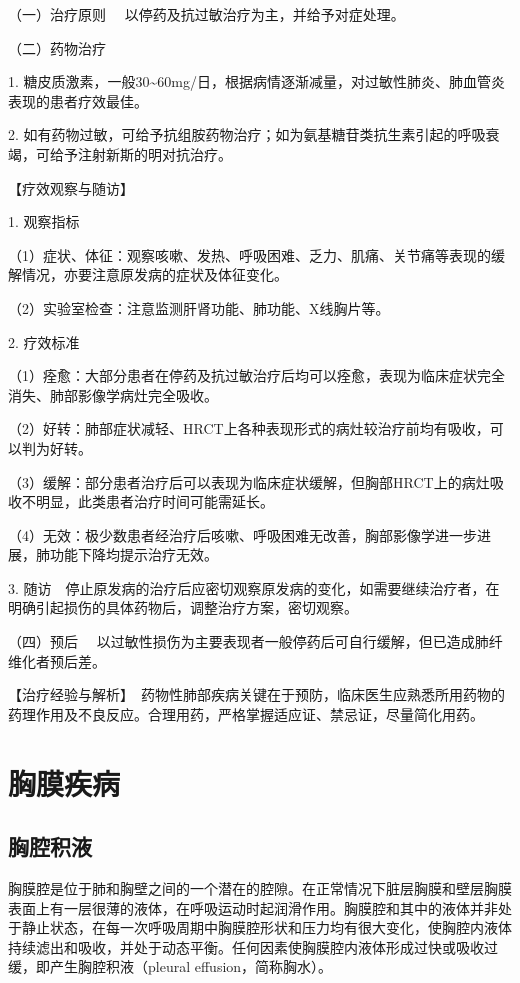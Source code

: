 {（一）治疗原则} 　以停药及抗过敏治疗为主，并给予对症处理。

{（二）药物治疗}

1.
糖皮质激素，一般30\textasciitilde{}60mg/日，根据病情逐渐减量，对过敏性肺炎、肺血管炎表现的患者疗效最佳。

2.
如有药物过敏，可给予抗组胺药物治疗；如为氨基糖苷类抗生素引起的呼吸衰竭，可给予注射新斯的明对抗治疗。

【疗效观察与随访】

1. 观察指标

（1）症状、体征：观察咳嗽、发热、呼吸困难、乏力、肌痛、关节痛等表现的缓解情况，亦要注意原发病的症状及体征变化。

（2）实验室检查：注意监测肝肾功能、肺功能、X线胸片等。

2. 疗效标准

（1）痊愈：大部分患者在停药及抗过敏治疗后均可以痊愈，表现为临床症状完全消失、肺部影像学病灶完全吸收。

（2）好转：肺部症状减轻、HRCT上各种表现形式的病灶较治疗前均有吸收，可以判为好转。

（3）缓解：部分患者治疗后可以表现为临床症状缓解，但胸部HRCT上的病灶吸收不明显，此类患者治疗时间可能需延长。

（4）无效：极少数患者经治疗后咳嗽、呼吸困难无改善，胸部影像学进一步进展，肺功能下降均提示治疗无效。

3.
随访　停止原发病的治疗后应密切观察原发病的变化，如需要继续治疗者，在明确引起损伤的具体药物后，调整治疗方案，密切观察。

{（四）预后}
　以过敏性损伤为主要表现者一般停药后可自行缓解，但已造成肺纤维化者预后差。

【治疗经验与解析】　药物性肺部疾病关键在于预防，临床医生应熟悉所用药物的药理作用及不良反应。合理用药，严格掌握适应证、禁忌证，尽量简化用药。

\section{胸膜疾病}

\subsection{胸腔积液}

胸膜腔是位于肺和胸壁之间的一个潜在的腔隙。在正常情况下脏层胸膜和壁层胸膜表面上有一层很薄的液体，在呼吸运动时起润滑作用。胸膜腔和其中的液体并非处于静止状态，在每一次呼吸周期中胸膜腔形状和压力均有很大变化，使胸腔内液体持续滤出和吸收，并处于动态平衡。任何因素使胸膜腔内液体形成过快或吸收过缓，即产生胸腔积液（pleural
effusion，简称胸水）。


